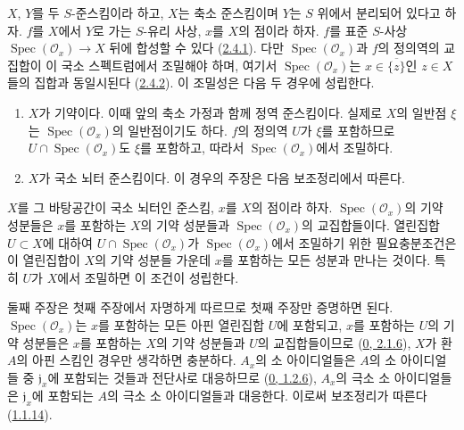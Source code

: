 \begin{env}[7.2.8]
\label{I.7.2.8-ko}
$X$, $Y$를 두 $S$-준스킴이라 하고, $X$는 축소 준스킴이며 $Y$는 $S$
위에서 분리되어 있다고 하자. $f$를 $X$에서 $Y$로 가는 $S$-유리
사상, $x$를 $X$의 점이라 하자. $f$를 표준 $S$-사상
$\operatorname{Spec}(\mathscr{O}_x)\to X$ 뒤에 합성할 수 있다
(\hyperref[I.2.4.1-ko]{2.4.1}). 다만 $\operatorname{Spec}(\mathscr{O}_x)$과
$f$의 정의역의 교집합이 이 국소 스펙트럼에서 조밀해야 하며, 여기서
$\operatorname{Spec}(\mathscr{O}_x)$는 $x\in\overline{\{z\}}$인 $z\in X$들의 집합과 동일시된다
(\hyperref[I.2.4.2-ko]{2.4.2}). 이 조밀성은 다음 두 경우에 성립한다.
\begin{enumerate}
  \item[1\textsuperscript{o}] $X$가 기약이다. 이때 앞의 축소 가정과
    함께 정역 준스킴이다. 실제로 $X$의 일반점 $\xi$는
    $\operatorname{Spec}(\mathscr{O}_x)$의 일반점이기도 하다. $f$의
    정의역 $U$가 $\xi$를 포함하므로
    $U\cap\operatorname{Spec}(\mathscr{O}_x)$도 $\xi$를 포함하고,
    따라서 $\operatorname{Spec}(\mathscr{O}_x)$에서 조밀하다.
  \item[2\textsuperscript{o}] $X$가 국소 뇌터 준스킴이다. 이 경우의
    주장은 다음 보조정리에서 따른다.
\end{enumerate}
\end{env}

\begin{lemma}[7.2.8.1]
\label{I.7.2.8.1-ko}
$X$를 그 바탕공간이 국소 뇌터인 준스킴, $x$를 $X$의 점이라 하자.
$\operatorname{Spec}(\mathscr{O}_x)$의 기약 성분들은 $x$를 포함하는
$X$의 기약 성분들과 $\operatorname{Spec}(\mathscr{O}_x)$의
교집합들이다. 열린집합 $U\subset X$에 대하여
$U\cap\operatorname{Spec}(\mathscr{O}_x)$가
$\operatorname{Spec}(\mathscr{O}_x)$에서 조밀하기 위한 필요충분조건은
이 열린집합이 $X$의 기약 성분들 가운데 $x$를 포함하는 모든 성분과
만나는 것이다. 특히
$U$가 $X$에서 조밀하면 이 조건이 성립한다.
\end{lemma}

둘째 주장은 첫째 주장에서 자명하게 따르므로 첫째 주장만 증명하면
된다. $\operatorname{Spec}(\mathscr{O}_x)$는 $x$를 포함하는 모든 아핀
열린집합 $U$에 포함되고, $x$를 포함하는 $U$의 기약 성분들은 $x$를
포함하는 $X$의 기약 성분들과 $U$의 교집합들이므로
(\hyperref[0.2.1.6-ko]{0, 2.1.6}), $X$가 환 $A$의 아핀 스킴인 경우만
생각하면 충분하다. $A_x$의 소 아이디얼들은
$A$의 소 아이디얼들 중 $\mathfrak{j}_x$에 포함되는 것들과 전단사로 대응하므로
(\hyperref[0.1.2.6-ko]{0, 1.2.6}), $A_x$의 극소 소 아이디얼들은
$\mathfrak{j}_x$에 포함되는 $A$의 극소 소 아이디얼들과 대응한다.
이로써 보조정리가 따른다(\hyperref[I.1.1.14-ko]{1.1.14}).

